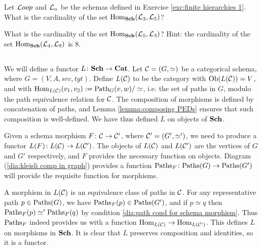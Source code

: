\documentclass[CT4S-EN-RU]{subfiles}
\begin{document}
\begin{exercise}
Let ${\mathcal{L} oop}$ and $\mathcal{L}_n$ be the schemas defined in Exercise \ref{exc:finite hierarchies 1}.
\sexc What is the cardinality of the set $\textnormal{Hom}_{\bf Sch}(\mathcal{L}_3,\mathcal{L}_5)$?
\item What is the cardinality of the set $\textnormal{Hom}_{\bf Sch}(\mathcal{L}_5,\mathcal{L}_3)$? Hint: the cardinality of the set $\textnormal{Hom}_{\bf Sch}(\mathcal{L}_4,\mathcal{L}_9)$ is 8.
\endsexc
\end{exercise}


\subsection{}\label{sec:proof of cat=sch}

\begin{construction}

We will define a functor $L\colon{\bf Sch}\rightarrow{\bf Cat}$. Let $\mathcal{C}=(G,\simeq)$ be a categorical schema, where $G=(V,A,src,tgt)$. Define $L(\mathcal{C})$ to be the category with $\textnormal{Ob}(L(\mathcal{C}))=V$, and with $\textnormal{Hom}_{L(\mathcal{C})}(v_1,v_2):=\textnormal{Path}_G(v,w)/\simeq$, i.e. the set of paths in $G$, modulo the path equivalence relation for $\mathcal{C}$. The composition of morphisms is defined by concatenation of paths, and Lemma \ref{lemma:composing PEDs} ensures that such composition is well-defined. We have thus defined $L$ on objects of ${\bf Sch}$.

Given a schema morphism $F\colon\mathcal{C}\rightarrow\mathcal{C}'$, where $\mathcal{C}'=(G',\simeq')$, we need to produce a functor $L(F)\colon L(\mathcal{C})\rightarrow L(\mathcal{C}')$. The objects of $L(\mathcal{C})$ and $L(\mathcal{C}')$ are the vertices of $G$ and $G'$ respectively, and $F$ provides the necessary function on objects. Diagram (\ref{dia:kleisli comp in graph}) provides a function $\textnormal{Paths}_F\colon\textnormal{Paths}(G)\rightarrow\textnormal{Paths}(G')$ will provide the requisite function for morphisms. 

A morphism in $L(\mathcal{C})$ is an equivalence class of paths in $\mathcal{C}$. For any representative path $p\in\textnormal{Paths}(G)$, we have $\textnormal{Paths}_F(p)\in\textnormal{Paths}(G')$, and if $p\simeq q$ then $\textnormal{Paths}_F(p)\simeq'\textnormal{Paths}_F(q)$ by condition \ref{dia:path cond for schema morphism}. Thus $\textnormal{Paths}_F$ indeed provides us with a function $\textnormal{Hom}_{L(\mathcal{C})}\rightarrow\textnormal{Hom}_{L(\mathcal{C}')}$. This defines $L$ on morphisms in ${\bf Sch}$. It is clear that $L$ preserves composition and identities, so it is a functor.

\end{construction}
\end{document}
